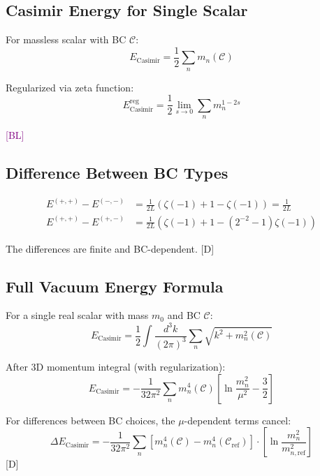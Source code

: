 \documentclass[11pt,a4paper]{article}
\newcommand{\tagD}{\textcolor{blue!70!black}{[D]}}
\newcommand{\tagBL}{\textcolor{purple}{[BL]}}
\begin{document}
\subsection{Casimir Energy for Single Scalar}

For massless scalar with BC $\mathcal{C}$:
\begin{equation}
\label{eq:app-casimir}
E_{\text{Casimir}} = \frac{1}{2} \sum_n m_n(\mathcal{C})
\end{equation}

Regularized via zeta function:
\begin{equation}
\label{eq:app-casimir-reg}
E_{\text{Casimir}}^{\text{reg}} = \frac{1}{2} \lim_{s \to 0} \sum_n m_n^{1-2s}
\end{equation}

\tagBL

\subsection{Difference Between BC Types}

\begin{align}
\label{eq:app-diff-NN-DD}
E^{(+,+)} - E^{(-,-)} &= \frac{1}{2L}\left(\zeta(-1) + 1 - \zeta(-1)\right) = \frac{1}{2L} \\
\label{eq:app-diff-NN-ND}
E^{(+,+)} - E^{(+,-)} &= \frac{1}{2L}\left(\zeta(-1) + 1 - (2^{-2} - 1)\zeta(-1)\right)
\end{align}

The differences are finite and BC-dependent. \tagD

\subsection{Full Vacuum Energy Formula}

For a single real scalar with mass $m_0$ and BC $\mathcal{C}$:
\begin{equation}
\label{eq:full-casimir}
E_{\text{Casimir}} = \frac{1}{2} \int \frac{d^3k}{(2\pi)^3} \sum_n \sqrt{k^2 + m_n^2(\mathcal{C})}
\end{equation}

After 3D momentum integral (with regularization):
\begin{equation}
\label{eq:casimir-3d-int}
E_{\text{Casimir}} = -\frac{1}{32\pi^2} \sum_n m_n^4(\mathcal{C}) \left[\ln\frac{m_n^2}{\mu^2} - \frac{3}{2}\right]
\end{equation}

For differences between BC choices, the $\mu$-dependent terms cancel:
\begin{equation}
\label{eq:casimir-diff-formula}
\Delta E_{\text{Casimir}} = -\frac{1}{32\pi^2} \sum_n \left[m_n^4(\mathcal{C}) - m_n^4(\mathcal{C}_{\text{ref}})\right]
\cdot \left[\ln\frac{m_n^2}{m_{n,\text{ref}}^2}\right]
\end{equation}
\tagD
\end{document}
